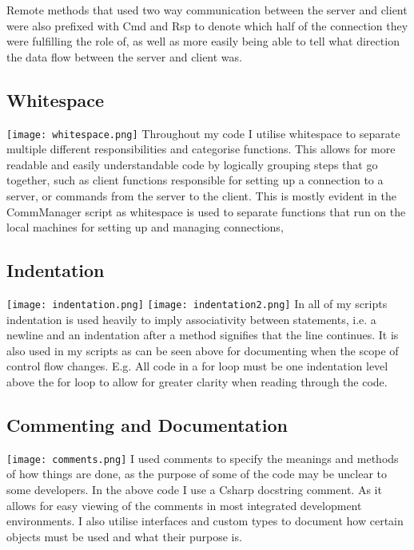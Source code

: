 \documentclass[12pt, DIV=calc]{scrartcl}
\begin{document}
Remote methods that used two way communication between the server and client were also prefixed with Cmd and Rsp to denote which half of the connection they were fulfilling the role of, as well as more easily being able to tell what direction the data flow between the server and client was.

\subsection{Whitespace}
\texttt{[image: whitespace.png]}
Throughout my code I utilise whitespace to separate multiple different responsibilities and categorise functions. This allows for more readable and easily understandable code by logically grouping steps that go together, such as client functions responsible for setting up a connection to a server, or commands from the server to the client. This is mostly evident in the CommManager script as whitespace is used to separate functions that run on the local machines for setting up and managing connections, 

\subsection{Indentation}
\texttt{[image: indentation.png]}
\texttt{[image: indentation2.png]}
In all of my scripts indentation is used heavily to imply associativity between statements, i.e. a newline and an indentation after a method signifies that the line continues. It is also used in my scripts as can be seen above for documenting when the scope of control flow changes. E.g. All code in a for loop must be one indentation level above the for loop to allow for greater clarity when reading through the code.

\subsection{Commenting and Documentation}
\texttt{[image: comments.png]} %
I used comments to specify the meanings and methods of how things are done, as the purpose of some of the code may be unclear to some developers. In the above code I use a Csharp docstring comment. As it allows for easy viewing of the comments in most integrated development environments. I also utilise interfaces and custom types to document how certain objects must be used and what their purpose is.
\end{document}
